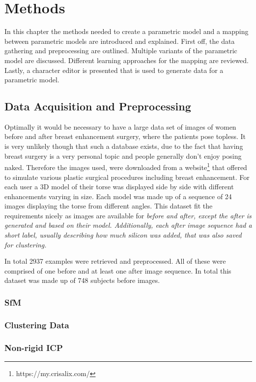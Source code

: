 \chapter{Methods}
In this chapter the methods needed to create a parametric model and  a mapping between parametric models are introduced and explained. First off, the data gathering and preprocessing are outlined. Multiple variants of the parametric model are discussed. Different learning approaches for the mapping are reviewed. Lastly, a character editor is presented that is used to generate data for a parametric model.

\section{Data Acquisition and Preprocessing}
Optimally it would be necessary to have a large data set of images of women before and after breast enhancement surgery, where the patients pose topless. It is very unlikely though that such a database exists, due to the fact that having breast surgery is a very personal topic and people generally don't enjoy posing naked. Therefore the images used, were downloaded from a website\footnote{https://my.crisalix.com/} that offered to simulate various plastic surgical procedures including breast enhancement. For each user a 3D model of their torse was displayed side by side with different enhancements varying in size. Each model was made up of a sequence of 24 images displaying the torse from different angles. This dataset fit the requirements nicely as images are available for \it{before} and \it{after}, except the \it{after} is generated and based on their model. Additionally, each after image sequence had a short label, usually describing how much silicon was added, that was also saved for clustering.

In total 2937 examples were retrieved and preprocessed. All of these were comprised of one before and at least one after image sequence. In total this dataset was made up of 748 subjects before images.
\subsection{SfM}
\subsection{Clustering Data}
\subsection{Non-rigid ICP}

